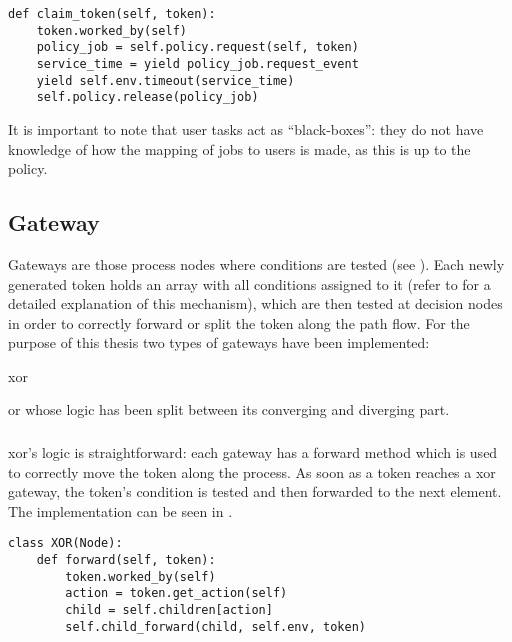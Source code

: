 \begin{lstlisting}[caption={User task claim method where a call to the corresponding policy request method is made. The policy performs role resolution effectively mapping a token to a user and returns the user's service time which is then yielded as a timeout in the discrete event simulation environment. When this time has elapsed, the policy releases the user.},label=lst:user_task,style=CustomPython]
def claim_token(self, token):
    token.worked_by(self)
    policy_job = self.policy.request(self, token)
    service_time = yield policy_job.request_event
    yield self.env.timeout(service_time)
    self.policy.release(policy_job)
\end{lstlisting}

It is important to note that user tasks act as ``black-boxes'': they do not have knowledge of how the mapping of jobs to users is made, as this is up to the policy.

\subsection{Gateway}

Gateways are those process nodes where conditions are tested (see ). Each newly generated token holds an array with all conditions assigned to it (refer to  for a detailed explanation of this mechanism), which are then tested at decision nodes in order to correctly forward or split the token along the path flow. For the purpose of this thesis two types of gateways have been implemented:
\begin{enumerate*}
     \item \gls{xor}
     \item \gls{or} whose logic has been split between its converging and diverging part.
 \end{enumerate*} 

\subsubsection{}

\gls{xor}'s logic is straightforward: each gateway has a forward method which is used to correctly move the token along the process. As soon as a token reaches a \gls{xor} gateway, the token's condition is tested and then forwarded to the next element. The implementation can be seen in . 

\begin{lstlisting}[caption=\glsentryshort{xor}'s forward method in which the to be forwarded to node is retrieved from the token path by looking for the corresponding value with the node id. Eventually a call to the \glsentryshort{xor}'s forward method is made.,label=lst:xor_forward,style=CustomPython]
class XOR(Node):
    def forward(self, token):
        token.worked_by(self)
        action = token.get_action(self)
        child = self.children[action]
        self.child_forward(child, self.env, token)
\end{lstlisting}

